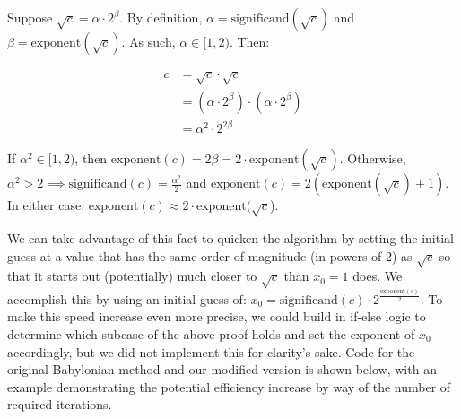 \documentclass[8pt]{article}
\begin{document}
Suppose $\sqrt{c} = \alpha \cdot 2^{\beta}$. By definition, $\alpha = \text{significand}(\sqrt{c})$ and $\beta = \text{exponent}(\sqrt{c})$. As such, $\alpha \in [1,2)$. Then:

\begin{align*}
c &= \sqrt{c} \cdot \sqrt{c} \\
&= (\alpha \cdot 2^{\beta}) \cdot (\alpha \cdot 2^{\beta}) \\
&= \alpha^2 \cdot 2^{2\beta}
\end{align*}

If $\alpha^2 \in [1,2)$, then $\text{exponent}(c) = 2\beta = 2 \cdot \text{exponent}(\sqrt{c})$. Otherwise, $\alpha^2 > 2 \implies \text{significand}(c) = \frac{\alpha^2}{2}$ and $\text{exponent}(c) = 2(\text{exponent}(\sqrt{c}) + 1)$. In either case, $\text{exponent}(c) \approx 2 \cdot \text{exponent}(\sqrt{c}$).

We can take advantage of this fact to quicken the algorithm by setting the initial guess at a value that has the same order of magnitude (in powers of 2) as $\sqrt{c}$ so that it starts out (potentially) much closer to $\sqrt{c}$ than $x_0 = 1$ does. We accomplish this by using an initial guess of: $x_0 = \text{significand}(c) \cdot 2^{\frac{\text{exponent}(c)}{2}}$. To make this speed increase even more precise, we could build in if-else logic to determine which subcase of the above proof holds and set the exponent of $x_0$ accordingly, but we did not implement this for clarity's sake. Code for the original Babylonian method and our modified version is shown below, with an example demonstrating the potential efficiency increase by way of the number of required iterations.
\end{document}
